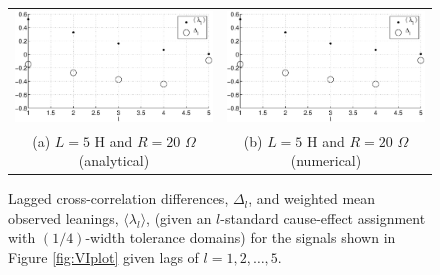 {\begin{center}
\begin{figure}[h]
\begin{center}
\begin{tabular}{cc}
\includegraphics[scale=0.3]{IRCircuitResponseExampleL5R20_LandLCC_an.eps} &
\includegraphics[scale=0.3]{IRCircuitResponseExampleL5R20_LandLCC_num.eps} \\
(a) $L=5$ H and $R=20$ $\Omega$ {\footnotesize (analytical)} & (b) $L=5$ H and $R=20$ $\Omega$ {\footnotesize (numerical)}
\end{tabular}
\end{center}
\caption[Lagged cross-correlation differences]{Lagged cross-correlation differences, $\Delta_l$, and weighted mean observed leanings, $\langle\lambda_l\rangle$, (given an $l$-standard cause-effect assignment with $(1/4)$-width tolerance domains) for the signals shown in Figure \ref{fig:VIplot} given lags of $l=1,2,\ldots,5$.}
\label{fig:VILandLCC}
\end{figure}
\end{center}
\vspace*{\fill}
\clearpage
}

